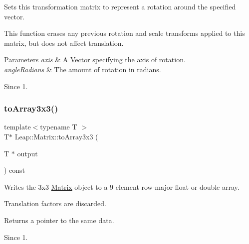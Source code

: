 Sets this transformation matrix to represent a rotation around the specified vector.


\begin{DoxyCodeInclude}
\end{DoxyCodeInclude}


This function erases any previous rotation and scale transforms applied to this matrix, but does not affect translation.


\begin{DoxyParams}{Parameters}
{\em axis} & A \hyperlink{struct_leap_1_1_vector}{Vector} specifying the axis of rotation. \\
\hline
{\em angle\+Radians} & The amount of rotation in radians. \\
\hline
\end{DoxyParams}
\begin{DoxySince}{Since}
1. 
\end{DoxySince}
\mbox{\label{struct_leap_1_1_matrix_a76088d466f47ec5203917a8885afb4ef}} 
\subsubsection{\texorpdfstring{to\+Array3x3()}{toArray3x3()}\hspace{0.1cm}{\footnotesize\ttfamily [1/2]}}
{\footnotesize\ttfamily template$<$typename T $>$ \\
T$\ast$ Leap\+::\+Matrix\+::to\+Array3x3 (\begin{DoxyParamCaption}\item[{T $\ast$}]{output }\end{DoxyParamCaption}) const\hspace{0.3cm}{\ttfamily [inline]}}

Writes the 3x3 \hyperlink{struct_leap_1_1_matrix}{Matrix} object to a 9 element row-\/major float or double array.

Translation factors are discarded.

Returns a pointer to the same data. \begin{DoxySince}{Since}
1. 
\end{DoxySince}
\mbox{\label{struct_leap_1_1_matrix_a311a7a928b61d3e75cb4980b832f163a}} 

